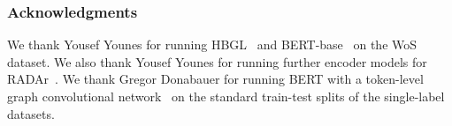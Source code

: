 \subsubsection*{Acknowledgments}
We thank Yousef Younes for running HBGL~\cite{hbgl} and BERT-base~\cite{DBLP:conf/naacl/DevlinCLT19} on the WoS dataset.
We also thank Yousef Younes for running further encoder models for RADAr~\cite{radar}.
We thank Gregor Donabauer for running BERT with a token-level graph convolutional network~\cite{donabauer2024tokenlevelgraphsshorttext} on the standard train-test splits of the single-label datasets.






